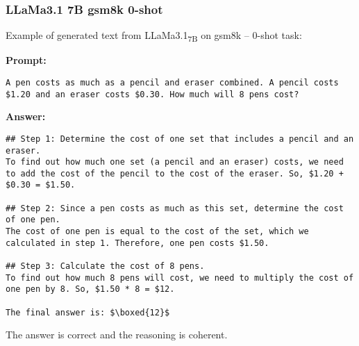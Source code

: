 \subsubsection*{LLaMa3.1 7B gsm8k 0-shot}
\noindent Example of generated text from LLaMa3.1\textsubscript{7B} on gsm8k -- 0-shot task:
\begin{displayquote}
	\textbf{Prompt:}
	\begin{Verbatim}[fontsize=\small,breaklines]
A pen costs as much as a pencil and eraser combined. A pencil costs $1.20 and an eraser costs $0.30. How much will 8 pens cost?
	\end{Verbatim}
	\textbf{Answer:}
	\begin{Verbatim}[fontsize=\small,breaklines]
## Step 1: Determine the cost of one set that includes a pencil and an eraser.
To find out how much one set (a pencil and an eraser) costs, we need to add the cost of the pencil to the cost of the eraser. So, $1.20 + $0.30 = $1.50.

## Step 2: Since a pen costs as much as this set, determine the cost of one pen.
The cost of one pen is equal to the cost of the set, which we calculated in step 1. Therefore, one pen costs $1.50.

## Step 3: Calculate the cost of 8 pens.
To find out how much 8 pens will cost, we need to multiply the cost of one pen by 8. So, $1.50 * 8 = $12.

The final answer is: $\boxed{12}$
	\end{Verbatim}
\end{displayquote}
The answer is correct and the reasoning is coherent.
